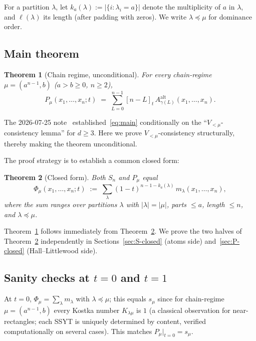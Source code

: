\documentclass[11pt]{article}
\newtheorem{theorem}{Theorem}
\theoremstyle{definition}
\newcommand{\Aalt}{A^{\mathrm{alt}}}
\newcommand{\gauss}[1]{[#1]_t}
\begin{document}
For a partition $\lambda$, let $k_a(\lambda) := |\{i : \lambda_i = a\}|$
denote the multiplicity of $a$ in $\lambda$, and $\ell(\lambda)$ its length
(after padding with zeros). We write $\lambda \preceq \mu$ for dominance
order.

\subsection{Main theorem}

\begin{theorem}[Chain regime, unconditional]\label{thm:main}
For every chain-regime $\mu = (a^{n-1}, b)$ ($a > b \ge 0$, $n \ge 2$),
\begin{equation}\label{eq:main}
  P_\mu(x_1, \ldots, x_n; t) \;=\; \sum_{L=0}^{n-1} \gauss{n-L}\, \Aalt_{\gamma(L)}(x_1, \ldots, x_n).
\end{equation}
\end{theorem}

The 2026-07-25 note~\cite{clio-0725} established~\eqref{eq:main} conditionally
on the ``$V_{<\mu}$-consistency lemma'' for $d \ge 3$. Here we prove
$V_{<\mu}$-consistency structurally, thereby making the theorem
unconditional.

The proof strategy is to establish a common closed form:

\begin{theorem}[Closed form]\label{thm:closed}
Both $S_n$ and $P_\mu$ equal
\begin{equation}\label{eq:closed}
  \Phi_\mu(x_1, \ldots, x_n; t) \;:=\; \sum_{\lambda} (1-t)^{n-1-k_a(\lambda)}\, m_\lambda(x_1, \ldots, x_n),
\end{equation}
where the sum ranges over partitions $\lambda$ with $|\lambda| = |\mu|$,
parts $\le a$, length $\le n$, and $\lambda \preceq \mu$.
\end{theorem}

Theorem~\ref{thm:main} follows immediately from Theorem~\ref{thm:closed}.
We prove the two halves of Theorem~\ref{thm:closed} independently in
Sections~\ref{sec:S-closed} (atoms side) and~\ref{sec:P-closed}
(Hall--Littlewood side).

\subsection{Sanity checks at $t = 0$ and $t = 1$}

At $t = 0$, $\Phi_\mu = \sum_\lambda m_\lambda$ with $\lambda \preceq \mu$;
this equals $s_\mu$ since for chain-regime $\mu = (a^{n-1}, b)$ every Kostka
number $K_{\lambda \mu}$ is $1$ (a classical observation for near-rectangles;
each SSYT is uniquely determined by content, verified computationally on
several cases). This matches $P_\mu|_{t=0} = s_\mu$.
\end{document}
